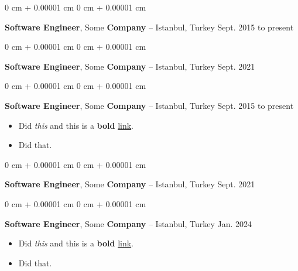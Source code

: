 \documentclass[10pt, letterpaper]{article}
\newenvironment{highlights}{
    \begin{itemize}[
        topsep=0.10 cm,
        parsep=0.10 cm,
        partopsep=0pt,
        itemsep=0pt,
        leftmargin=0 cm + 10pt
    ]
}{
    \end{itemize}
        
    \vspace{-0.20cm}
} %
\newenvironment{onecolentry}{
    \begin{adjustwidth}{
        0 cm + 0.00001 cm
    }{
        0 cm + 0.00001 cm
    }
}{
    \end{adjustwidth}
} %
\begin{document}
        \begin{onecolentry}
            \textbf{Software Engineer}, Some \textbf{Company} -- Istanbul, Turkey \hfill Sept. 2015 to present
        \end{onecolentry}

        \vspace{0.1 cm}

        \begin{onecolentry}
            \textbf{Software Engineer}, Some \textbf{Company} -- Istanbul, Turkey \hfill Sept. 2021
        \end{onecolentry}

        \vspace{0.1 cm}

        \begin{onecolentry}
            \textbf{Software Engineer}, Some \textbf{Company} -- Istanbul, Turkey \hfill Sept. 2015 to present
            \begin{highlights}
                \item Did \textit{this} and this is a \textbf{bold} \href{https://example.com}{link}.
                \item Did that.
            \end{highlights}
        \end{onecolentry}

        \vspace{0.1 cm}

        \begin{onecolentry}
            \textbf{Software Engineer}, Some \textbf{Company} -- Istanbul, Turkey \hfill Sept. 2021
        \end{onecolentry}

        \vspace{0.1 cm}

        \begin{onecolentry}
            \textbf{Software Engineer}, Some \textbf{Company} -- Istanbul, Turkey \hfill Jan. 2024
            \begin{highlights}
                \item Did \textit{this} and this is a \textbf{bold} \href{https://example.com}{link}.
                \item Did that.
            \end{highlights}
        \end{onecolentry}

        \vspace{0.1 cm}
\end{document}
